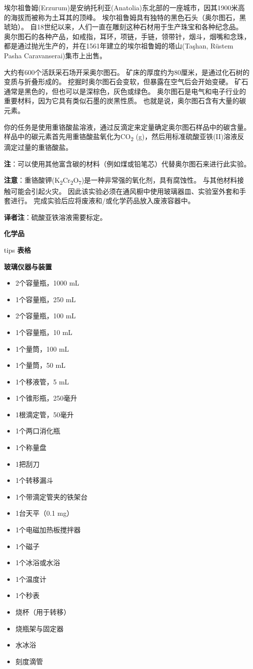 埃尔祖鲁姆(Erzurum)是安纳托利亚(Anatolia)东北部的一座城市，因其1900米高的海拔而被称为土耳其的顶峰。
埃尔祖鲁姆具有独特的黑色石头（奥尔图石，黑琥珀）。
自18世纪以来，人们一直在雕刻这种石材用于生产珠宝和各种纪念品。
奥尔图石的各种产品，如戒指，耳环，项链，手链，领带针，烟斗，烟嘴和念珠，都是通过抛光生产的，并在1561年建立的埃尔祖鲁姆的塔山(Taşhan,
Rüstem Pasha Caravanserai)集市上出售。

大约有600个活跃采石场开采奥尔图石。
矿床的厚度约为80厘米，是通过化石树的变质与折叠形成的。
挖掘时奥尔图石会变软，但暴露在空气后会开始变硬。
矿石通常是黑色的，但也可以是深棕色，灰色或绿色。
奥尔图石是电气和电子行业的重要材料，因为它具有类似石墨的炭黑性质。
也就是说，奥尔图石含有大量的碳元素。

你的任务是使用重铬酸盐溶液，通过反滴定来定量确定奥尔图石样品中的碳含量。
样品中的碳元素首先用重铬酸盐氧化为CO\textsubscript{2}
(g)，然后用标准硫酸亚铁(II)溶液反滴定过量的重铬酸盐。

\textbf{注}：可以使用其他富含碳的材料（例如煤或铅笔芯）代替奥尔图石来进行此实验。

\textbf{注意}：重铬酸钾(K\textsubscript{2}Cr\textsubscript{2}O\textsubscript{7})是一种非常强的氧化剂，具有腐蚀性。
与其他材料接触可能会引起火灾。
因此该实验必须在通风橱中使用玻璃器皿、实验室外套和手套进行。
完成实验后应将废液和/或化学药品放入废液容器中。

\textbf{译者注}：硫酸亚铁溶液需要标定。

\noindent\textbf{化学品}

tips \textbf{表格}

\noindent\textbf{玻璃仪器与装置}

\begin{itemize}
\tightlist
\item
  2个容量瓶，1000 mL
\item
  1个容量瓶，250 mL
\item
  2个容量瓶，100 mL
\item
  1个容量瓶，10 mL
\item
  1个量筒，100 mL
\item
  1个量筒，50 mL
\item
  1个移液管，5 mL
\item
  1个锥形瓶，250毫升
\item
  1根滴定管，50毫升
\item
  1个两口消化瓶
\item
  1个称量盘
\item
  1把刮刀
\item
  1个转移漏斗
\item
  1个带滴定管夹的铁架台
\item
  1台天平（0.1 mg）
\item
  1个电磁加热板搅拌器
\item
  1个磁子
\item
  1个冰浴或水浴
\item
  1个温度计
\item
  1个秒表
\item
  烧杯（用于转移）
\item
  烧瓶架与固定器
\item
  水冰浴
\item
  刻度滴管
\end{itemize}

